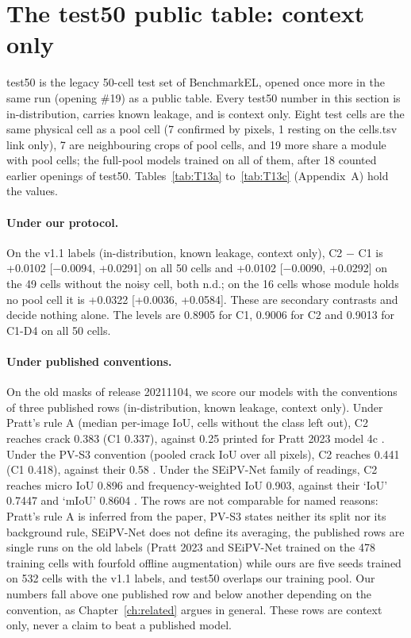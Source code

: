 \section{The test50 public table: context only}\label{sec:e1-test50}

test50 is the legacy 50-cell test set of BenchmarkEL, opened once more in the same run (opening \#19) as a public table. Every test50 number
in this section is in-distribution, carries known leakage, and is context only. Eight test cells are the same physical cell as
a pool cell (7 confirmed by pixels, 1 resting on the cells.tsv link only), 7 are neighbouring crops of pool cells, and 19 more
share a module with pool cells; the full-pool models trained on all of them, after 18 counted earlier openings of test50.
Tables~\ref{tab:T13a} to~\ref{tab:T13c} (Appendix~A) hold the values.

\paragraph{Under our protocol.} On the v1.1 labels (in-distribution, known leakage, context only), C2 $-$ C1 is +0.0102
[$-$0.0094, +0.0291] on all 50 cells and +0.0102 [$-$0.0090, +0.0292] on the 49 cells without the noisy cell, both n.d.; on the
16 cells whose module holds no pool cell it is +0.0322 [+0.0036, +0.0584]. These are secondary contrasts and decide nothing alone.
The levels are 0.8905 for C1, 0.9006 for C2 and 0.9013 for C1-D4 on all 50 cells.

\paragraph{Under published conventions.} On the old masks of release 20211104, we score our models with the conventions of three
published rows \citep{pratt2023benchmark,eesaar2023seipv,jha2025pvs3} (in-distribution, known leakage, context only). Under Pratt's rule A (median per-image
IoU, cells without the class left out), C2 reaches crack 0.383 (C1 0.337), against 0.25 printed for Pratt 2023 model 4c
\citep{pratt2023benchmark}. Under the PV-S3 convention (pooled crack IoU over all pixels), C2 reaches 0.441 (C1 0.418), against their 0.58
\citep{jha2025pvs3}. Under the SEiPV-Net family of readings, C2 reaches micro IoU 0.896 and frequency-weighted IoU 0.903, against their
`IoU' 0.7447 and `mIoU' 0.8604 \citep{eesaar2023seipv}. The rows are not comparable for named reasons: Pratt's rule A is inferred from the
paper, PV-S3 states neither its split nor its background rule, SEiPV-Net does not define its averaging, the published rows are
single runs on the old labels (Pratt 2023 and SEiPV-Net trained on the 478 training cells with fourfold offline augmentation)
while ours are five seeds trained on 532 cells with the v1.1 labels, and test50 overlaps our training pool. Our numbers fall above one published row and below another depending on the convention, as Chapter~\ref{ch:related}
argues in general. These rows are context only, never a claim to beat a published model.

